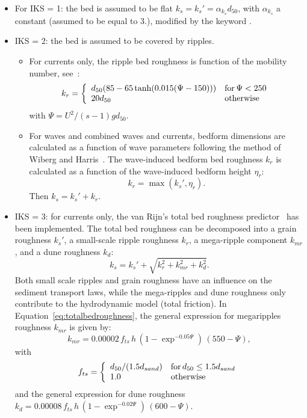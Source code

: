\begin{itemize}
\item For {\ttfamily IKS = 1}: the bed is assumed to be flat $k_s = k_s'= \alpha_{k_s} d_{50}$, with $\alpha_{k_s}$ a constant (assumed to be equal to $3.$), modified by the keyword . 
\item {\ttfamily IKS = 2}: the bed is assumed to be covered by ripples.
  \begin{itemize}
    \item For currents only, the ripple bed roughness is function of the mobility number, see~\cite{vanRijn07}:
\begin{equation*}
k_r =\left\{\begin{array}{ll}
d_{50}(85-65\tanh(0.015(\Psi-150))) & \text{for\,} \Psi<250\\
20 d_{50} & \text{otherwise} 
\end{array}
\right.
\end{equation*}
with $\Psi =U^2/(s-1)gd_{50}$.

    \item For waves and combined waves and currents, bedform dimensions are calculated
as a function of wave parameters following the method of Wiberg and Harris~\cite{WibergHarris}. 
The wave-induced bedform bed roughness $k_r$ is calculated as a function of the wave-induced bedform 
height $\eta_r$: 
\begin{equation}
k_r = \max(k_s', \eta_r).
\end{equation}
Then $k_s=k_s'+k_r$.
  \end{itemize}
 
\item {\ttfamily IKS = 3}: for currents only, the van Rijn's total bed roughness predictor~\cite{vanRijn07, Huybrechts} has been implemented. 
The total bed roughness can be decomposed into a grain
roughness $k_s'$, a small-scale ripple roughness $k_r$, a mega-ripple 
component $k_{mr}$, and a dune roughness $k_d$:
\begin{equation}\label{eq:totalbedroughness}
k_s = k_s' + \sqrt{k_r^2 + k_{mr}^2 + k_d^2}. 
\end{equation}
Both small scale ripples and grain roughness have an influence on the
sediment transport laws, while the mega-ripples and dune roughness only
contribute to the hydrodynamic model (total friction). In Equation~\ref{eq:totalbedroughness}, the general expression for megaripples roughness $k_{mr}$ is given by:
\begin{equation}
k_{mr} = 0.00002\,f_{ts}\,h\,(1-\exp^{-0.05\Psi})\,(550-\Psi),
\end{equation}
with
\begin{equation*}
f_{ts} =\left\{\begin{array}{ll}
d_{50}/(1.5d_{sand}) & \text{for\,} d_{50}\leq 1.5d_{sand}\\
1.0 & \text{otherwise} 
\end{array}
\right.
\end{equation*}
and the general expression for dune roughness $k_d=0.00008\,f_{ts}\,h\,(1-\exp^{-0.02\Psi})\,(600-\Psi)$.

\end{itemize}


